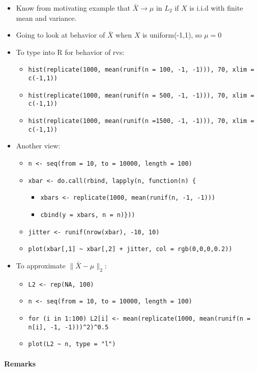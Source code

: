 \begin{itemize}
\item Know from motivating example that $\bar X \to \mu$ in $L_2$ if
        $X$ is i.i.d with finite mean and variance.
\item Going to look at behavior of $\bar X$ when $X$ is uniform(-1,1), so $\mu = 0$
\item To type into R for behavior of rvs:
\begin{itemize}
\item \texttt{hist(replicate(1000, mean(runif(n = 100, -1, -1))), 70, xlim = c(-1,1))}
\item \texttt{hist(replicate(1000, mean(runif(n = 500, -1, -1))), 70, xlim = c(-1,1))}
\item \texttt{hist(replicate(1000, mean(runif(n =1500, -1, -1))), 70, xlim = c(-1,1))}
\end{itemize}
\item Another view:
\begin{itemize}
\item \texttt{n <- seq(from = 10, to = 10000, length = 100)}
\item \texttt{xbar <- do.call(rbind, lapply(n, function(n) \{}
\begin{itemize}
\item \texttt{xbars <- replicate(1000, mean(runif(n, -1, -1)))}
\item \texttt{cbind(y = xbars, n = n)\}))}
\end{itemize}
\item \texttt{jitter <- runif(nrow(xbar), -10, 10)}
\item \texttt{plot(xbar[,1] \textasciitilde{} xbar[,2] + jitter, col = rgb(0,0,0,0.2))}
\end{itemize}
\item To approximate $\|\bar X - \mu\|_2$:
\begin{itemize}
\item \texttt{L2 <- rep(NA, 100)}
\item \texttt{n <- seq(from = 10, to = 10000, length = 100)}
\item \texttt{for (i in 1:100)              L2[i] <- mean(replicate(1000, mean(runif(n = n[i], -1, -1)))\textasciicircum{}2)\textasciicircum{}0.5}
\item \texttt{plot(L2 \textasciitilde{} n, type = "l")}
\end{itemize}
\end{itemize}
\paragraph{Remarks}
\label{sec-1-2-3}

